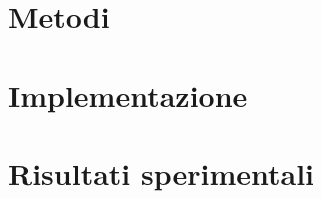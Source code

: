 \documentclass[Lau,binding=0.6cm]{sapthesis}
\begin{document}



\chapter{Metodi}


\chapter{Implementazione}


\chapter{Risultati sperimentali}
\end{document}
